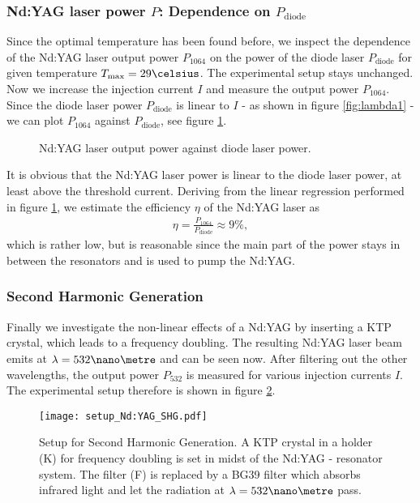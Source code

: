\subsubsection{Nd:YAG laser power $P$: Dependence on $P_\text{diode}$}
Since the optimal temperature has been found before, we inspect the dependence of the Nd:YAG laser output power $P_{1064}$ on the power of the diode laser $P_\text{diode}$ for given temperature $T_\text{max}=29\celsius$. The experimental setup stays unchanged. Now we increase the injection current $I$ and measure the output power $P_{1064}$. Since the diode laser power $P_\text{diode}$ is linear to $I$ - as shown in figure \ref{fig:lambda1} - we can plot $P_{1064}$ against $P_\text{diode}$, see figure \ref{fig:P1064}.

\begin{figure}[h]
	\centering
	
	\caption{Nd:YAG laser output power against diode laser power.}
	\label{fig:P1064}
\end{figure}

It is obvious that the Nd:YAG laser power is linear to the diode laser power, at least above the threshold current. Deriving from the linear regression performed in figure \ref{fig:P1064}, we estimate the efficiency $\eta$ of the Nd:YAG laser as
\begin{align}
\eta=\tfrac{P_{1064}}{P_\text{diode}}\approx 9\%,
\end{align}
which is rather low, but is reasonable since the main part of the power stays in between the resonators and is used to pump the Nd:YAG.
\subsubsection{Second Harmonic Generation}
Finally we investigate the non-linear effects of a Nd:YAG by inserting a KTP crystal, which leads to a frequency doubling. The resulting Nd:YAG laser beam emits at $\lambda=532\nano\metre$ and can be seen now. After filtering out the other wavelengths, the output power $P_{532}$ is measured for various injection currents $I$. The experimental setup therefore is shown in figure \ref{fig:setup_Nd:YAG_SHG}.

\begin{figure}
	\centering
	\texttt{[image: setup\_Nd:YAG\_SHG.pdf]}
	\caption[Setup for Second Harmonic Generation]{Setup for Second Harmonic Generation. A KTP crystal in a holder (K) for frequency doubling is set in midst of the Nd:YAG - resonator system. The filter (F) is replaced by a BG39 filter which absorbs infrared light and let the radiation at $\lambda=532\nano\metre$ pass. \cite{lit:manual}}
	\label{fig:setup_Nd:YAG_SHG}
\end{figure}

